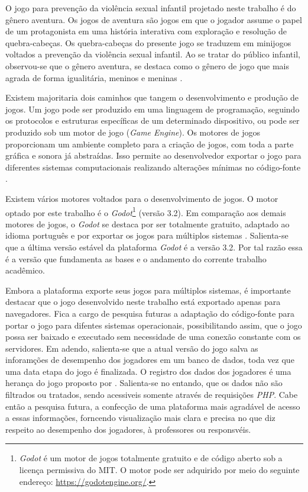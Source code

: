 O jogo para prevenção da violência sexual infantil projetado neste trabalho é do gênero aventura. Os jogos de aventura são jogos em que o jogador assume o papel de um protagonista em uma história interativa com exploração e resolução de quebra-cabeças. Os quebra-cabeças do presente jogo se traduzem em minijogos voltados a prevenção da violência sexual infantil. Ao se tratar do público infantil, observou-se que o gênero aventura, se destaca como o gênero de jogo que mais agrada de forma igualitária, meninos e meninas \cite{brandtzaeg2009children}. %

Existem majoritaria dois caminhos que tangem o desenvolvimento e produção de jogos. Um jogo pode ser produzido em uma linguagem de programação, seguindo os protocolos e estruturas específicas de um determinado dispositivo, ou pode ser produzido sob um motor de jogo (\textit{Game Engine}). %
Os motores de jogos proporcionam um ambiente completo para a criação de jogos, com toda a parte gráfica e sonora já abstraídas. Isso permite ao desenvolvedor exportar o jogo para diferentes sistemas computacionais realizando alterações mínimas no código-fonte \cite{bishop1998designing, machado2009serious}. 

Existem vários motores voltados para o desenvolvimento de jogos. O motor optado por este trabalho é o \textit{Godot}\footnote{\textit{Godot} é um motor de jogos totalmente gratuito e de código aberto sob a licença permissiva do MIT. O motor pode ser adquirido por meio do seguinte endereço: \url{https://godotengine.org/}.} (versão 3.2). Em comparação aos demais motores de jogos, o \textit{Godot} se destaca por ser totalmente gratuito, adaptado ao idioma português e por exportar os jogos para múltiplos sistemas \cite{scherer2020analise}. Salienta-se que a última versão estável da plataforma \textit{Godot} é a versão 3.2. Por tal razão essa é a versão que fundamenta as bases e o andamento do corrente trabalho acadêmico. 



Embora a plataforma exporte seus jogos para múltiplos sistemas, é importante destacar que o jogo desenvolvido neste trabalho está exportado apenas para navegadores. Fica a cargo de pesquisa futuras a adaptação do código-fonte para portar o jogo para difentes sistemas operacionais, possibilitando assim, que o jogo possa ser baixado e executado sem necessidade de uma conexão constante com os servidores. Em adendo, salienta-se que a atual versão do jogo salva as inforamções de desempenho dos jogadores em um banco de dados, toda vez que uma data etapa do jogo é finalizada. O registro dos dados dos jogadores é uma herança do jogo proposto por . Salienta-se no entando, que os dados não são filtrados ou tratados, sendo acessiveis somente através de requisições \textit{PHP}. Cabe então a pesquisa futura, a confecção de uma plataforma mais agradável de acesso a essas informações, forncendo visualização mais clara e precisa no que diz respeito ao desempenho dos jogadores, à professores ou responsvéis.


